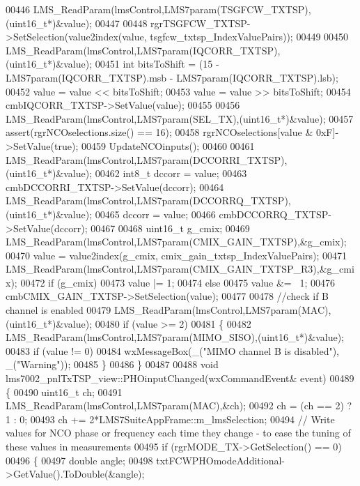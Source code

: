 \begin{DoxyCode}
{{{{{{{{{{{00446     LMS_ReadParam(lmsControl,LMS7param(TSGFCW_TXTSP),(uint16\_t*)&value);
00447 
00448     rgrTSGFCW_TXTSP->SetSelection(value2index(value, 
      tsgfcw_txtsp_IndexValuePairs));
00449 
00450     LMS_ReadParam(lmsControl,LMS7param(IQCORR_TXTSP),(uint16\_t*)&value);
00451     \textcolor{keywordtype}{int} bitsToShift = (15 - LMS7param(IQCORR_TXTSP).msb - LMS7param(IQCORR_TXTSP).lsb);
00452     value = value << bitsToShift;
00453     value = value >> bitsToShift;
00454     cmbIQCORR_TXTSP->SetValue(value);
00455 
00456     LMS_ReadParam(lmsControl,LMS7param(SEL_TX),(uint16\_t*)&value);
00457     assert(rgrNCOselections.size() == 16);
00458     rgrNCOselections[value & 0xF]->SetValue(\textcolor{keyword}{true});
00459     UpdateNCOinputs();
00460 
00461     LMS_ReadParam(lmsControl,LMS7param(DCCORRI_TXTSP),(uint16\_t*)&value);
00462     int8\_t dccorr = value;
00463     cmbDCCORRI_TXTSP->SetValue(dccorr);
00464     LMS_ReadParam(lmsControl,LMS7param(DCCORRQ_TXTSP),(uint16\_t*)&value);
00465     dccorr = value;
00466     cmbDCCORRQ_TXTSP->SetValue(dccorr);
00467 
00468     uint16\_t g\_cmix;
00469     LMS_ReadParam(lmsControl,LMS7param(CMIX_GAIN_TXTSP),&g\_cmix);
00470     value = value2index(g\_cmix, cmix_gain_txtsp_IndexValuePairs);
00471     LMS_ReadParam(lmsControl,LMS7param(CMIX_GAIN_TXTSP_R3),&g\_cmix);
00472     \textcolor{keywordflow}{if} (g\_cmix)
00473         value |= 1;
00474     \textcolor{keywordflow}{else}
00475         value &= ~1;
00476     cmbCMIX_GAIN_TXTSP->SetSelection(value);
00477 
00478     \textcolor{comment}{//check if B channel is enabled}
00479     LMS_ReadParam(lmsControl,LMS7param(MAC),(uint16\_t*)&value);
00480     \textcolor{keywordflow}{if} (value >= 2)
00481     \{
00482         LMS_ReadParam(lmsControl,LMS7param(MIMO_SISO),(uint16\_t*)&value);
00483         \textcolor{keywordflow}{if} (value != 0)
00484             wxMessageBox(\_(\textcolor{stringliteral}{"MIMO channel B is disabled"}), \_(\textcolor{stringliteral}{"Warning"}));
00485     \}
00486 \}
00487 
00488 \textcolor{keywordtype}{void} lms7002_pnlTxTSP_view::PHOinputChanged(wxCommandEvent& event)
00489 \{
00490     uint16\_t ch;
00491     LMS_ReadParam(lmsControl,LMS7param(MAC),&ch);
00492     ch = (ch == 2) ? 1 : 0;
00493     ch += 2*LMS7SuiteAppFrame::m_lmsSelection;
00494     \textcolor{comment}{// Write values for NCO phase or frequency each time they change - to ease the tuning of these values
       in measurements}
00495     \textcolor{keywordflow}{if} (rgrMODE_TX->GetSelection() == 0)
00496     \{
00497         \textcolor{keywordtype}{double} angle;
00498         txtFCWPHOmodeAdditional->GetValue().ToDouble(&angle);
}}}}}}}}}}}
\end{DoxyCode}
